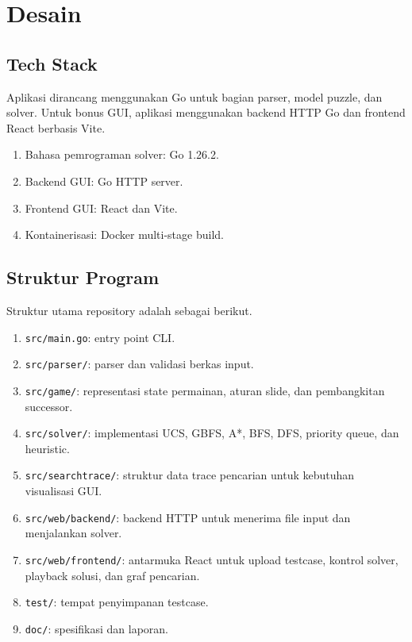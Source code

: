 \section{Desain}\label{sec:Desain}

\subsection{Tech Stack}\label{sub:Tech Stack}

Aplikasi dirancang menggunakan Go untuk bagian parser, model puzzle,
dan solver. Untuk bonus GUI, aplikasi menggunakan backend HTTP Go dan
frontend React berbasis Vite.

\begin{enumerate}
    \item Bahasa pemrograman solver: Go 1.26.2.
    \item Backend GUI: Go HTTP server.
    \item Frontend GUI: React dan Vite.
    \item Kontainerisasi: Docker multi-stage build.
\end{enumerate}

\subsection{Struktur Program}\label{sub:Struktur Program}

Struktur utama repository adalah sebagai berikut.
\begin{enumerate}
    \item \texttt{src/main.go}: entry point CLI.
    \item \texttt{src/parser/}: parser dan validasi berkas input.
    \item \texttt{src/game/}: representasi state permainan, aturan
        slide, dan pembangkitan successor.
    \item \texttt{src/solver/}: implementasi UCS, GBFS, A*, BFS, DFS,
        priority queue, dan heuristic.
    \item \texttt{src/searchtrace/}: struktur data trace pencarian
        untuk kebutuhan visualisasi GUI.
    \item \texttt{src/web/backend/}: backend HTTP untuk menerima file
        input dan menjalankan solver.
    \item \texttt{src/web/frontend/}: antarmuka React untuk upload
        testcase, kontrol solver, playback solusi, dan graf pencarian.
    \item \texttt{test/}: tempat penyimpanan testcase.
    \item \texttt{doc/}: spesifikasi dan laporan.
\end{enumerate}

